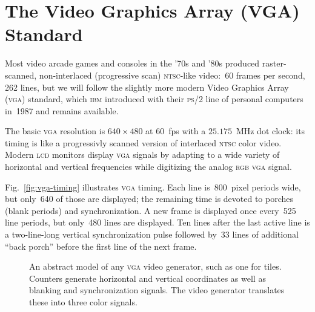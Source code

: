 \documentclass[11pt]{article}
\newcommand{\figref}[1]{Fig.~\ref{fig:#1}}
\newcommand{\buswidth}[1]{-- node {/} node [above] {#1}}
\newcommand\expandtotextwidth{
  \path (current bounding box) ++(-0.5\textwidth,0) ++(1\textwidth,0);
}
\begin{document}
\section{The Video Graphics Array (VGA) Standard}

Most video arcade games and consoles in the '70s and '80s produced
raster-scanned, non-interlaced (progressive scan) \textsc{ntsc}-like
video:~60 frames per second, 262 lines, but we will follow the
slightly more modern Video Graphics Array (\textsc{vga}) standard,
which \textsc{ibm} introduced with their \textsc{ps}/2 line of
personal computers in~1987 and remains available.

The basic \textsc{vga} resolution is $640\times480$ at 60~fps with a
$25.175$~MHz dot clock: its timing is like a progressivly scanned
version of interlaced \textsc{ntsc} color video.  Modern \textsc{lcd}
monitors display \textsc{vga} signals by adapting to a wide variety of
horizontal and vertical frequencies while digitizing the analog
\textsc{rgb} \textsc{vga} signal.

\figref{vga-timing} illustrates \textsc{vga} timing.  Each line
is~800~pixel periods wide, but only~640 of those are displayed; the
remaining time is devoted to porches (blank periods) and
synchronization.  A new frame is displayed once every~525 line
periods, but only~480 lines are displayed.  Ten lines after the last
active line is a two-line-long vertical synchronization pulse followed
by~33 lines of additional ``back porch'' before the first line of the
next frame.


\begin{figure}
  \caption{An abstract model of any \textsc{vga} video generator, such
    as one for tiles.  Counters generate horizontal and vertical
    coordinates as well as blanking and synchronization signals. The
    video generator translates these into three color signals.}
  \label{fig:video-logic}
\end{figure}
\end{document}
